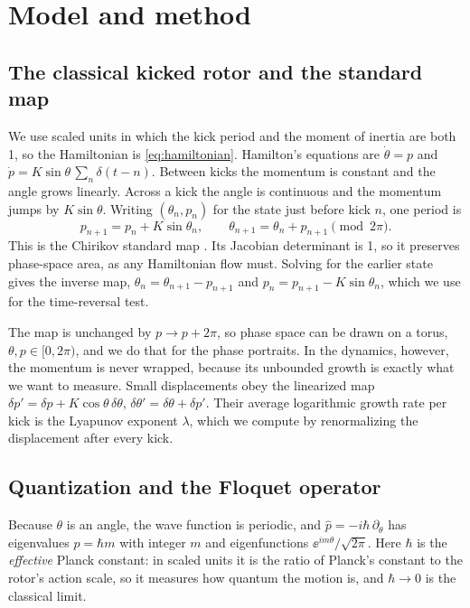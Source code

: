 \section{Model and method}
\label{sec:model}

\subsection{The classical kicked rotor and the standard map}

We use scaled units in which the kick period and the moment of inertia are both 1, so the Hamiltonian is
\cref{eq:hamiltonian}. Hamilton's equations are $\dot\theta = p$ and
$\dot p = K\sin\theta\,\sum_n\delta(t-n)$. Between kicks the momentum is constant and the angle grows
linearly. Across a kick the angle is continuous and the momentum jumps by $K\sin\theta$. Writing
$(\theta_n, p_n)$ for the state just before kick $n$, one period is
\begin{equation}
  p_{n+1} = p_n + K\sin\theta_n, \qquad \theta_{n+1} = \theta_n + p_{n+1} \pmod{2\pi}.
  \label{eq:standard_map}
\end{equation}
This is the Chirikov standard map \cite{Chirikov1979}. Its Jacobian determinant is 1, so it preserves
phase-space area, as any Hamiltonian flow must. Solving for the earlier state gives the inverse map,
$\theta_n = \theta_{n+1} - p_{n+1}$ and $p_n = p_{n+1} - K\sin\theta_n$, which we use for the time-reversal
test.

The map is unchanged by $p \to p + 2\pi$, so phase space can be drawn on a torus,
$\theta, p \in [0, 2\pi)$, and we do that for the phase portraits. In the dynamics, however, the momentum is
never wrapped, because its unbounded growth is exactly what we want to measure. Small displacements obey the
linearized map $\delta p' = \delta p + K\cos\theta\,\delta\theta$, $\delta\theta' = \delta\theta + \delta p'$.
Their average logarithmic growth rate per kick is the Lyapunov exponent $\lambda$, which we compute by
renormalizing the displacement after every kick.

\subsection{Quantization and the Floquet operator}

Because $\theta$ is an angle, the wave function is periodic, and $\hat p = -i\hbar\,\partial_\theta$ has
eigenvalues $p = \hbar m$ with integer $m$ and eigenfunctions $\ee^{im\theta}/\sqrt{2\pi}$. Here $\hbar$ is the
\emph{effective} Planck constant: in scaled units it is the ratio of Planck's constant to the rotor's action
scale, so it measures how quantum the motion is, and $\hbar\to 0$ is the classical limit.

